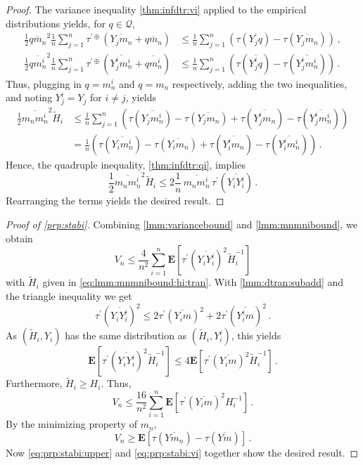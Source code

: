 \documentclass{article}
\newcommand*{\mc}[1]{\mathcal{#1}}
\newcommand{\lab}{\left[} %
\newcommand{\rab}{\right]} %
\newcommand{\ab}[1]{\lab #1 \rab} %
\newcommand{\abOf}[1]{\!\ab{#1}} %
\newcommand{\lb}{\left(} %
\newcommand{\rb}{\right)} %
\newcommand{\br}[1]{\lb #1 \rb} %
\newcommand{\brOf}[1]{\!\br{#1}} %
\newcommand{\E}{\mathbf{E}} %
\newcommand{\EOf}[1]{\E\abOf{#1}}
\newcommand{\pr}{^\prime}
\newcommand{\eqcm}{\,,} %
\newcommand{\eqfs}{\,.}
\newcommand{\ol}[2]{\overline{#1#2}}
\newcommand{\tran}{\tau}
\newcommand{\dtran}{\tau\pr}
\newcommand{\ddrtran}{\tau^{\prime\oplus}}
\begin{document}
%
\begin{proof}
	The variance inequality \cref{thm:infdtr:vi} applied to the empirical distributions yields, for $q\in\mc Q$,
	\begin{align}
		\frac12 \ol q{m_n}^2 \frac1n \sum_{j=1}^n \ddrtran\brOf{\ol {Y_j}{m_n} + \ol q{m_n}}
		&\leq
		\frac1n \sum_{j=1}^n \br{\tran(\ol {Y_j}q) - \tran(\ol {Y_j}{m_n})} 
		\eqcm
		\\
		\frac12 \ol q{m_n^i}^2 \frac1n \sum_{j=1}^n \ddrtran\brOf{\ol {Y_j^i}{m_n^i} + \ol q{m_n^i}}
		&\leq
		\frac1n \sum_{j=1}^n \br{\tran(\ol {Y_j^i}q) - \tran(\ol {Y_j^i}{m_n^i})} 
		\eqfs
	\end{align}
	Thus, plugging in $q = m_n^i$ and $q = m_n$ respectively, adding the two inequalities, and noting $Y_j^i = Y_j$ for $i\neq j$, yields
	\begin{align}
		\frac{1}2 \ol {m_n}{m_n^i}^2 \tilde H_i 
		&\leq 
		\frac1n \sum_{j=1}^n \br{
			\tran(\ol {Y_j}{m_n^i}) -
			\tran(\ol {Y_j}{m_n}) +
			\tran(\ol {Y_j^i}{m_n}) -
			\tran(\ol {Y_j^i}{m_n^i})
		}  
		\\&=
		\frac1n \br{
			\tran(\ol {Y_i}{m_n^i}) -
			\tran(\ol {Y_i}{m_n}) +
			\tran(\ol {Y_i^i}{m_n}) -
			\tran(\ol {Y_i^i}{m_n^i})
		}  
		\eqfs
	\end{align}
	Hence, the quadruple inequality, \cref{thm:infdtr:qi}, implies
	\begin{equation}
		\frac{1}2 \ol {m_n}{m_n^i}^2 \tilde H_i 
		\leq
		2
		\frac1n \,
		\ol {m_n}{m_n^i}\,
		\dtran(\ol {Y_i}{Y_i^i})
		\eqfs
	\end{equation}
	Rearranging the terms yields the desired result.
\end{proof}
%
\begin{proof}[Proof of \cref{prp:stabi}]
	Combining \cref{lmm:variancebound} and \cref{lmm:mnmnibound}, we obtain
	\begin{equation}
		V_n \leq \frac{4}{n^2}\sum_{i=1}^n \EOf{\dtran(\ol {Y_i}{Y_i^i})^2 \tilde H_i^{-1}}
	\end{equation}
	with $\tilde H_i$ given in \eqref{eq:lmm:mnmnibound:hi:tran}.
	With \cref{lmm:dtran:subadd} and the triangle inequality we get
	\begin{equation}
		\dtran(\ol {Y_i}{Y_i^i})^2 \leq 2 \dtran(\ol {Y_i}{m})^2 + 2\dtran(\ol {Y_i^i}m)^2
		\eqfs
	\end{equation}
	As $(\tilde H_i, Y_i)$ has the same distribution as $(\tilde H_i, Y_i^i)$, this yields
	\begin{equation}
		\EOf{\dtran(\ol {Y_i}{Y_i^i})^2 \tilde H_i^{-1}} \leq 4 \EOf{\dtran(\ol {Y_i}{m})^2 \tilde H_i^{-1}}
		\eqfs
	\end{equation} 
	Furthermore, $\tilde H_i \geq H_i$. Thus,
	\begin{equation}\label{eq:prp:stabi:upper}
		V_n \leq \frac{16}{n^2}\sum_{i=1}^n \EOf{\dtran(\ol {Y_i}{m})^2 H_i^{-1}}
		\eqfs
	\end{equation}
	By the minimizing property of $m_n$,
	\begin{equation}\label{eq:prp:stabi:vi}
		V_n 
		\geq 
		\EOf{\tran(\ol Y{m_n}) - \tran(\ol Ym)}
		\eqfs
	\end{equation}
	Now \eqref{eq:prp:stabi:upper} and \eqref{eq:prp:stabi:vi} together show the desired result.
\end{proof}
\end{document}

